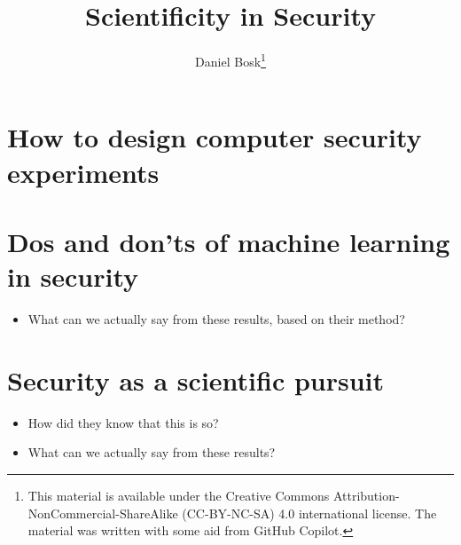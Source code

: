 \title{%
  Scientificity in Security
}
\author{Daniel Bosk\thanks{%
    This material is available under the Creative Commons 
    Attribution-NonCommercial-ShareAlike (CC-BY-NC-SA) 4.0 international 
    license.
    The material was written with some aid from GitHub Copilot.
}}

\begin{frame}
  \maketitle
\end{frame}

\mode*

\begin{abstract}
  
\end{abstract}

\clearpage

\section{How to design computer security experiments}

\section{Dos and don'ts of machine learning in security}

\begin{frame}
  \begin{question}
    \begin{itemize}
      \item What can we actually say from these results, based on their method?
    \end{itemize}
  \end{question}
\end{frame}

\section{Security as a scientific pursuit}

\begin{frame}
  \begin{question}
    \begin{itemize}
      \item How did they know that this is so?
      \item What can we actually say from these results?
    \end{itemize}
  \end{question}
\end{frame}

